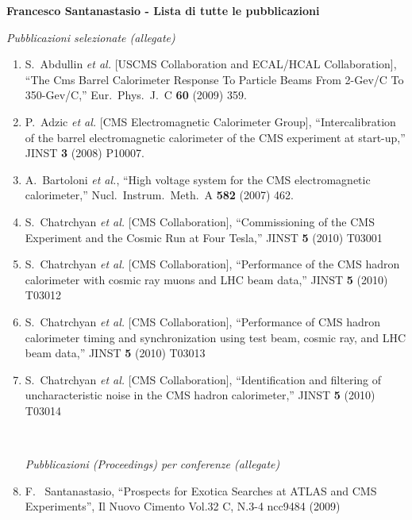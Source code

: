 \documentclass[10pt]{letter}
\begin{document}
{\large \sc \bf Francesco Santanastasio - Lista di tutte le pubblicazioni}

\begin{center} \textit{Pubblicazioni selezionate (allegate)} \end{center}

\begin{enumerate}
\item S.~Abdullin {\it et al.}  [USCMS Collaboration and ECAL/HCAL Collaboration],
  ``The Cms Barrel Calorimeter Response To Particle Beams From 2-Gev/C To 350-Gev/C,''
  Eur.\ Phys.\ J.\  C {\bf 60} (2009) 359.
\item P.~Adzic {\it et al.}  [CMS Electromagnetic Calorimeter Group],
  ``Intercalibration of the barrel electromagnetic calorimeter of the CMS
  experiment at start-up,'' JINST {\bf 3} (2008) P10007.
\item A.~Bartoloni {\it et al.},
  ``High voltage system for the CMS electromagnetic calorimeter,''
  Nucl.\ Instrum.\ Meth.\  A {\bf 582} (2007) 462.
\item S.~Chatrchyan {\it et al.}  [CMS Collaboration],
  ``Commissioning of the CMS Experiment and the Cosmic Run at Four Tesla,''
  JINST {\bf 5} (2010) T03001
\item S.~Chatrchyan {\it et al.}  [CMS Collaboration],
  ``Performance of the CMS hadron calorimeter with cosmic ray muons and LHC beam data,''
  JINST {\bf 5} (2010) T03012
\item S.~Chatrchyan {\it et al.}  [CMS Collaboration],
  ``Performance of CMS hadron calorimeter timing and synchronization using test beam, cosmic ray, and LHC beam data,''
  JINST {\bf 5} (2010) T03013
\item S.~Chatrchyan {\it et al.}  [CMS Collaboration],
  ``Identification and filtering of uncharacteristic noise in the CMS hadron calorimeter,''
  JINST {\bf 5} (2010) T03014

~\\
\begin{center} \textit{Pubblicazioni (Proceedings) per conferenze (allegate)} \\ 
\end{center}

\item F. ~Santanastasio, ``Prospects for Exotica Searches at ATLAS and CMS Experiments'', 
  Il Nuovo Cimento Vol.32 C, N.3-4 ncc9484 (2009)


\end{enumerate}
\end{document}
